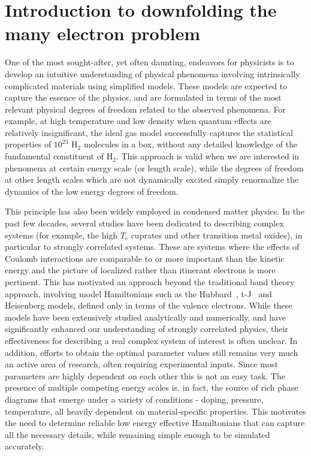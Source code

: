 \documentclass[prl,12pt,onecolumn,nofootinbib,notitlepage,english,superscriptaddress]{revtex4-1}
\begin{document}
\section{Introduction to downfolding the many electron problem}

One of the most sought-after, yet often daunting, endeavors for physicists is to develop 
an intuitive understanding of physical phenomena involving intrinsically complicated materials 
using simplified models. These models are expected to capture the essence of the physics, and are formulated in terms 
of the most relevant physical degrees of freedom related to the observed phenomena. 
For example, at high temperature and low density when quantum effects are relatively insignificant, the ideal gas model 
successfully captures the statistical properties of $10^{23}$ H$_{2}$ molecules in a box, 
without any detailed knowledge of the fundamental constituent of H$_{2}$. This approach is valid when we are interested in 
phenomena at certain energy scale (or length scale), while the degrees of freedom at other length scales which are not 
dynamically excited simply renormalize the dynamics of the low energy degrees of freedom. 

This principle has also been widely employed in condensed matter physics. In the past few decades, several studies 
have been dedicated to describing complex systems (for example, the high $T_c$ cuprates and other transition metal oxides), 
in particular to strongly correlated systems. These are systems where the effects of Coulomb 
interactions are comparable to or more important than the kinetic energy and the picture of 
localized rather than itinerant electrons is more pertinent. This has motivated an approach beyond the 
traditional band theory approach, involving model Hamiltonians such as the Hubbard~\cite{Hubbard}, t-J~\cite{tJSpalek} 
and Heisenberg models, defined only in terms of the valence electrons. 
While these models have been extensively studied analytically and numerically, and have significantly 
enhanced our understanding of strongly correlated physics, their effectiveness 
for describing a real complex system of interest is often unclear. In addition, efforts to obtain the 
optimal parameter values still remains very much an active area of research, often requiring experimental inputs. 
Since most parameters are highly dependent on each other this is not an easy task. 
The presence of multiple competing energy scales is, in fact, the source of rich phase diagrams that 
emerge under a variety of conditions - doping, pressure, 
temperature, all heavily dependent on material-specific properties. This motivates 
the need to determine reliable low energy effective Hamiltonians that can capture all the necessary details, while 
remaining simple enough to be simulated accurately.  
\end{document}
